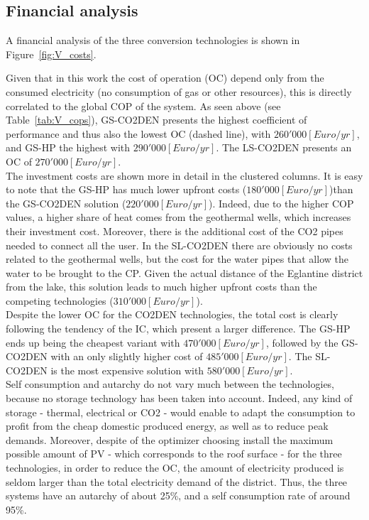 \documentclass{article}
\begin{document}
\subsection{Financial analysis}

A financial analysis of the three conversion technologies is shown in Figure~\ref{fig:V_costs}. 

Given that in this work the cost of operation (OC) depend only from the consumed electricity (no consumption of gas or other resources), this is directly correlated to the global COP of the system. As seen above (see Table~\ref{tab:V_cops}), GS-CO2DEN presents the highest coefficient of performance and thus also the lowest OC (dashed line), with $260'000[Euro/yr]$, and GS-HP the highest with $290'000[Euro/yr]$. The LS-CO2DEN presents an OC of $270'000[Euro/yr]$.\\

The investment costs are shown more in detail in the clustered columns. It is easy to note that the GS-HP has much lower upfront costs ($180'000[Euro/yr]$)than the GS-CO2DEN solution ($220'000[Euro/yr]$). Indeed, due to the higher COP values, a higher share of heat comes from the geothermal wells, which increases their investment cost. Moreover, there is the additional cost of the CO2 pipes needed to connect all the user. In the SL-CO2DEN there are obviously no costs related to the geothermal wells, but the cost for the water pipes that allow the water to be brought to the CP. Given the actual distance of the Eglantine district from the lake, this solution leads to much higher upfront costs than the competing technologies ($310'000[Euro/yr]$).\\

Despite the lower OC for the CO2DEN technologies, the total cost is clearly following the tendency of the IC, which present a larger difference. The GS-HP ends up being the cheapest variant with $470'000 [Euro/yr]$, followed by the GS-CO2DEN with an only slightly higher cost of $485'000 [Euro/yr]$. The SL-CO2DEN is the most expensive solution with $580'000 [Euro/yr]$.\\

Self consumption and autarchy do not vary much between the technologies, because no storage technology has been taken into account. Indeed, any kind of storage - thermal, electrical or CO2 - would enable to adapt the consumption to profit from the cheap domestic produced energy, as well as to reduce peak demands. Moreover, despite of the optimizer choosing install the maximum possible amount of PV - which corresponds to the roof surface - for the three technologies, in order to reduce the OC, the amount of electricity produced is seldom larger than the total electricity demand of the district. Thus, the three systems have an autarchy of about 25\%, and a self consumption rate of around 95\%.\\
\end{document}
